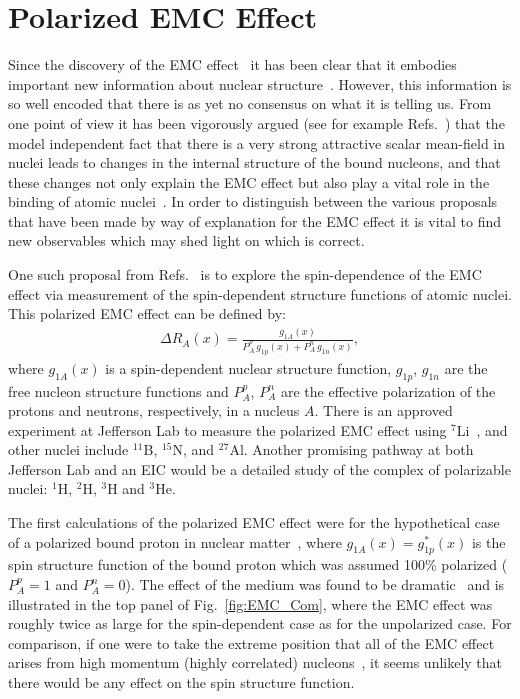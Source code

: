 \section{Polarized EMC Effect\label{sec:pemc}}
%
Since the discovery of the EMC effect~\cite{Aubert:1983xm,Bodek:1983ec} it has been clear that it embodies important new information about nuclear structure~\cite{Geesaman:1995yd}. However, this information is so well encoded that there is as yet no consensus on what it is telling us. From one point of view it has been vigorously argued (see for example Refs.~\cite{Thomas:2016bxx,Guichon:2018uew}) that the model independent fact that there is a very strong attractive scalar mean-field in nuclei leads to changes in the internal structure of the bound nucleons, and that these changes not only explain the EMC effect but also play a vital role in the binding of atomic nuclei~\cite{Stone:2017oqt,Stone:2016qmi}. In order to distinguish between the various proposals that have been made by way of explanation for the EMC effect it is vital to find new observables which may shed light on which is correct.

One such proposal from Refs.~\cite{Cloet:2005rt,Cloet:2006bq} is to explore the spin-dependence of the EMC effect via measurement of the spin-dependent structure functions of atomic nuclei. This polarized EMC effect can be defined by:
%
\begin{align}
\Delta R_A(x) = \frac{g_{1A}(x)}{P_A^p\,g_{1p}(x) + P_A^n\,g_{1n}(x)},
\label{eq:pemc}
\end{align}
%
where $g_{1A}(x)$ is a spin-dependent nuclear structure function, $g_{1p}$, $g_{1n}$ are the free nucleon structure functions and $P_A^p$, $P_A^n$ are the effective polarization of the protons and neutrons, respectively, in a nucleus $A$. There is an approved experiment at Jefferson Lab to measure the polarized EMC effect using $^7$Li~\cite{jlabspin}, and other nuclei include $^{11}$B, $^{15}$N, and $^{27}$Al. Another promising pathway at both Jefferson Lab and an EIC would be a detailed study of the complex of polarizable nuclei: $^1$H, $^2$H, $^3$H and $^3$He.

The first calculations of the polarized EMC effect were for the hypothetical case of a polarized bound proton in nuclear matter~\cite{Cloet:2005rt}, where $g_{1A}(x) = g_{1p}^*(x)$ is the spin structure function of the bound proton which was assumed 100\% polarized ($P_A^p=1$ and $P_A^n = 0$). The effect of the medium was found to be dramatic~\cite{Cloet:2005rt} and is illustrated in the top panel of Fig.~\ref{fig:EMC_Com}, where the EMC effect was roughly twice as large for the spin-dependent case as for the unpolarized case.  For comparison, if one were to take the extreme position that all of the EMC effect arises from high momentum (highly correlated) nucleons~\cite{Weinstein:2010rt}, it seems unlikely that there would be any effect on the spin structure function.

